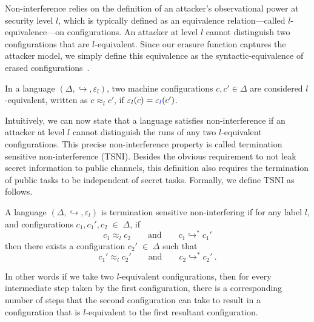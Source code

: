 \documentclass{sigplanconf}
\begin{document}
Non-interference relies on the definition of an attacker's observational power at
security level \ensuremath{l}, which is typically defined as an equivalence
relation---called \ensuremath{l}-equivalence---on configurations.  An attacker
at level \ensuremath{l} cannot
distinguish two configurations that are \ensuremath{l}-equivalent.
%
Since our erasure function captures the attacker model, we simply define this
equivalence as the syntactic-equivalence of erased configurations~\cite{stefan:addressing-covert}.
%
\begin{definition}
    In a language \ensuremath{(\Delta,\hookrightarrow,\varepsilon_{l})}, two machine configurations
    \ensuremath{c,c'\in\Delta} are considered $l$-equivalent, written as \ensuremath{c\approx_lc'},
    if \ensuremath{\varepsilon_{l}(c)\mathrel{=}\varepsilon_{\ifc{l}}(c')}.
\end{definition}
%

Intuitively, we can now state that a language satisfies non-interference if an
attacker at level \ensuremath{l} cannot distinguish the runs of any two \ensuremath{l}-equivalent
configurations.
%
This precise non-interference property is called termination sensitive non-interference
(TSNI).  Besides the obvious requirement to not leak secret information
to public channels, this definition also requires the termination
of public tasks to be independent of secret tasks.
%
Formally, we define TSNI as follows.

\begin{definition}
  A language \ensuremath{(\Delta,\hookrightarrow,\varepsilon_{l})} is termination
  sensitive non-interfering if for any label \ensuremath{l}, and configurations
  \ensuremath{c_{1},c_{1}',c_{2}\;\in\;\Delta}, if
  \begin{equation} \label{eq:tsni-lhs}
    \ensuremath{c_{1}} \approx_{\ensuremath{l}} \ensuremath{c_{2}}
    \qquad \text{and} \qquad
    \ensuremath{c_{1}} \ensuremath{\hookrightarrow}^* \ensuremath{c_{1}'}
  \end{equation}
  then there exists a configuration \ensuremath{c_{2}'\;\in\;\Delta} such that
  \begin{equation} \label{eq:tsni-rhs}
    \ensuremath{c_{1}'} \approx_{\ensuremath{l}} \ensuremath{c_{2}'}
     \qquad \text{and} \qquad
    \ensuremath{c_{2}} \ensuremath{\hookrightarrow}^* \ensuremath{c_{2}'}
    \ \text{.}
  \end{equation}
\end{definition}
%
In other words if we take two \ensuremath{l}-equivalent configurations, then for every
intermediate step taken by the first configuration, there is a corresponding
number of steps that the second configuration can take to result in a
configuration that is \ensuremath{l}-equivalent to the first resultant configuration.
\end{document}
